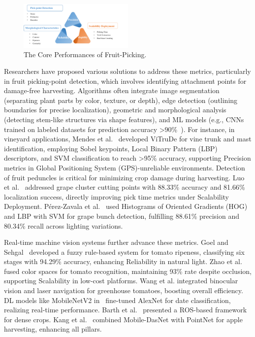\documentclass[a4paper,fleqn]{cas-dc}
\begin{document}
\begin{figure}[hbtp]
\centering
\includegraphics[width=0.5\textwidth]{fig_performance.png}
\caption{The Core Performances of Fruit-Picking.}
\label{fig:performance}
\end{figure}

Researchers have proposed various solutions to address these metrics, particularly in fruit picking-point detection, which involves identifying attachment points for damage-free harvesting. Algorithms often integrate image segmentation (separating plant parts by color, texture, or depth), edge detection (outlining boundaries for precise localization), geometric and morphological analysis (detecting stem-like structures via shape features), and ML models (e.g., CNNs trained on labeled datasets for prediction accuracy >90\%~\cite{mendes2016vine}).
For instance, in vineyard applications, Mendes et al.~\cite{mendes2016vine} developed ViTruDe for vine trunk and mast identification, employing Sobel keypoints, Local Binary Pattern (LBP) descriptors, and SVM classification to reach >95\% accuracy, supporting Precision metrics in  Global Positioning System (GPS)-unreliable environments.
Detection of fruit peduncles is critical for minimizing crop damage during harvesting. 
Luo et al.~\cite{luo2018vision} addressed grape cluster cutting points with 88.33\% accuracy and 81.66\% localization success, directly improving pick time metrics under Scalability Deployment.
Pérez-Zavala et al.~\cite{perez2018pattern} used Histograms of Oriented Gradients (HOG) and LBP with SVM for grape bunch detection, fulfilling 88.61\% precision and 80.34\% recall across lighting variations.

Real-time machine vision systems further advance these metrics. 
Goel and Sehgal~\cite{goel2015fuzzy} developed a fuzzy rule-based system for tomato ripeness, classifying six stages with 94.29\% accuracy, enhancing Reliability in natural light. 
Zhao et al.~\cite{zhao2016robust} fused color spaces for tomato recognition, maintaining 93\% rate despite occlusion, supporting Scalability in low-cost platforms.
Wang et al.\cite{lili2017development} integrated binocular vision and laser navigation for greenhouse tomatoes, boosting overall efficiency.
DL models like MobileNetV2 in~\cite{altaheri2019date} fine-tuned AlexNet for date classification, realizing real-time performance. 
Barth et al.~\cite{barth2016design} presented a ROS-based framework for dense crops.
Kang et al.~\cite{kang2020real}  combined Mobile-DasNet with PointNet for apple harvesting, enhancing all pillars.
\end{document}
